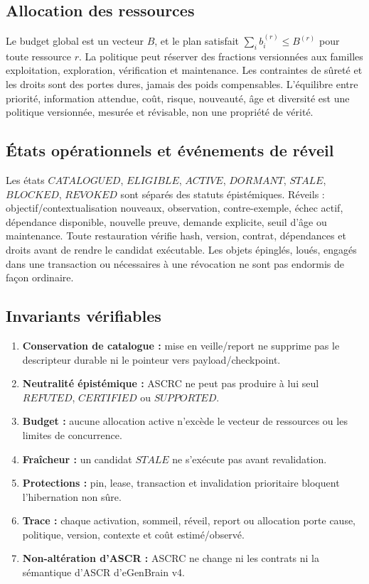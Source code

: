 \subsection{Allocation des ressources}
Le budget global est un vecteur $B$, et le plan satisfait $\sum_i b_i^{(r)}\leq B^{(r)}$ pour toute ressource $r$. La politique peut réserver des fractions versionnées aux familles exploitation, exploration, vérification et maintenance. Les contraintes de sûreté et les droits sont des portes dures, jamais des poids compensables. L'équilibre entre priorité, information attendue, coût, risque, nouveauté, âge et diversité est une politique versionnée, mesurée et révisable, non une propriété de vérité.

\subsection{États opérationnels et événements de réveil}
Les états $CATALOGUED$, $ELIGIBLE$, $ACTIVE$, $DORMANT$, $STALE$, $BLOCKED$, $REVOKED$ sont séparés des statuts épistémiques. Réveils : objectif/contextualisation nouveaux, observation, contre-exemple, échec actif, dépendance disponible, nouvelle preuve, demande explicite, seuil d'âge ou maintenance. Toute restauration vérifie hash, version, contrat, dépendances et droits avant de rendre le candidat exécutable. Les objets épinglés, loués, engagés dans une transaction ou nécessaires à une révocation ne sont pas endormis de façon ordinaire.

\subsection{Invariants vérifiables}
\begin{enumerate}
\item \textbf{Conservation de catalogue :} mise en veille/report ne supprime pas le descripteur durable ni le pointeur vers payload/checkpoint.
\item \textbf{Neutralité épistémique :} ASCRC ne peut pas produire à lui seul $REFUTED$, $CERTIFIED$ ou $SUPPORTED$.
\item \textbf{Budget :} aucune allocation active n'excède le vecteur de ressources ou les limites de concurrence.
\item \textbf{Fraîcheur :} un candidat $STALE$ ne s'exécute pas avant revalidation.
\item \textbf{Protections :} pin, lease, transaction et invalidation prioritaire bloquent l'hibernation non sûre.
\item \textbf{Trace :} chaque activation, sommeil, réveil, report ou allocation porte cause, politique, version, contexte et coût estimé/observé.
\item \textbf{Non-altération d'ASCR :} ASCRC ne change ni les contrats ni la sémantique d'ASCR d'eGenBrain v4.
\end{enumerate}

